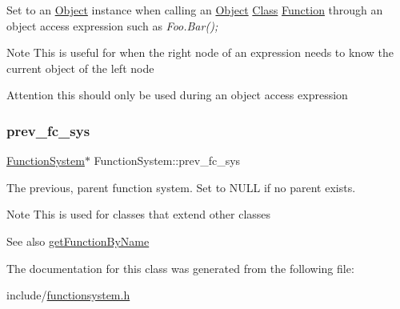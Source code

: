 Set to an \hyperlink{classObject}{Object} instance when calling an \hyperlink{classObject}{Object} \hyperlink{classClass}{Class} \hyperlink{classFunction}{Function} through an object access expression such as {\itshape Foo.\+Bar();} \begin{DoxyNote}{Note}
This is useful for when the right node of an expression needs to know the current object of the left node 
\end{DoxyNote}
\begin{DoxyAttention}{Attention}
this should only be used during an object access expression 
\end{DoxyAttention}
\mbox{\label{classFunctionSystem_a0d223ca42b6d6617af61136bdb1f33dd}} 
\subsubsection{\texorpdfstring{prev\+\_\+fc\+\_\+sys}{prev\_fc\_sys}}
{\footnotesize\ttfamily \hyperlink{classFunctionSystem}{Function\+System}$\ast$ Function\+System\+::prev\+\_\+fc\+\_\+sys}

The previous, parent function system. Set to N\+U\+LL if no parent exists. \begin{DoxyNote}{Note}
This is used for classes that extend other classes 
\end{DoxyNote}
\begin{DoxySeeAlso}{See also}
\hyperlink{classFunctionSystem_a6ccd76d0760272b64790d6f5c8cdc607}{get\+Function\+By\+Name} 
\end{DoxySeeAlso}


The documentation for this class was generated from the following file\+:\begin{DoxyCompactItemize}
\item 
include/\hyperlink{functionsystem_8h}{functionsystem.\+h}\end{DoxyCompactItemize}
